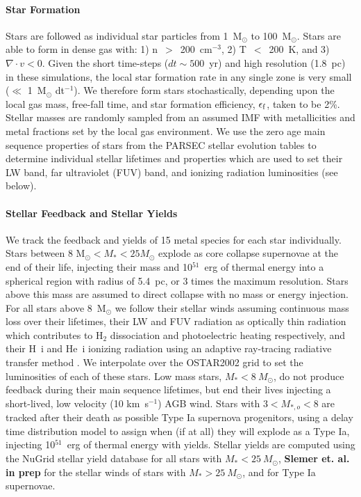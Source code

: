 \documentclass[twocolumn]{aastex61}
\begin{document}
\paragraph{Star Formation} Stars are followed as individual star particles from 1~M$_{\odot}$ to 100~M$_{\odot}$. Stars are able to form in dense gas with: 1) n~$>$~200~cm$^{-3}$, 2) T~$<$~200~K, and 3) $\nabla \cdot v < 0$. Given the short time-steps ($dt \sim 500$~yr) and high resolution (1.8~pc) in these simulations, the local star formation rate in any single zone is very small ($\ll$ 1~M$_{\odot}$ dt$^{-1}$). We therefore form stars stochastically, depending upon the local gas mass, free-fall time, and star formation efficiency, $\epsilon_{\rm f}$, taken to be 2\%. Stellar masses are randomly sampled from an assumed \cite{Salpeter1955} IMF with metallicities and metal fractions set by the local gas environment. We use the zero age main sequence properties of stars from the \textsc{PARSEC} stellar evolution tables \citep{Bressan2012,Tang2014} to determine individual stellar lifetimes and properties which are used to set their LW band, far ultraviolet (FUV) band, and ionizing radiation luminosities (see below).

\paragraph{Stellar Feedback and Stellar Yields} We track the feedback and yields of 15 metal species for each star individually. Stars between 8 M$_{\odot} < M_{*} < 25 M_{\odot}$ explode as core collapse supernovae at the end of their life, injecting their mass and 10$^{51}$~erg of thermal energy into a spherical region with radius of 5.4~pc, or 3 times the maximum resolution. Stars above this mass are assumed to direct collapse with no mass or energy injection. For all stars above 8~M$_{\odot}$ we follow their stellar winds assuming continuous mass loss over their lifetimes, their LW and FUV radiation as optically thin radiation which contributes to H$_2$ dissociation and photoelectric heating respectively, and their H~{\sc i} and He~{\sc i} ionizing radiation using an adaptive ray-tracing radiative transfer method \citep{WiseAbel2011}. We interpolate over the OSTAR2002 \citep{Lanz2003} grid to set the luminosities of each of these stars. Low mass stars, $M_{*} < 8~M_{\odot}$, do not produce feedback during their main sequence lifetimes, but end their lives injecting a short-lived, low velocity (10 km~s$^{-1}$) AGB wind. Stars with $3 < M_{*,o} < 8$ are tracked after their death as possible Type Ia supernova progenitors, using a delay time distribution model to assign when (if at all) they will explode as a Type Ia, injecting 10$^{51}$~erg of thermal energy with yields. Stellar yields are computed using the NuGrid stellar yield database \citep{Ritter2017} for all stars with $M_{*} < 25~M_{\odot}$, \textbf{Slemer et. al. in prep} for the stellar winds of stars with $M_{*} > 25~M_{\odot}$, and \cite{Thielemann1986} for Type Ia supernovae.
\end{document}
